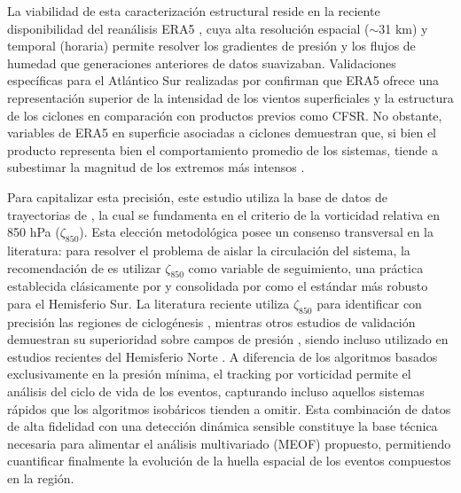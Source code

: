La viabilidad de esta caracterización estructural reside en la reciente disponibilidad del reanálisis ERA5 \citep{hersbach2020era5}, cuya alta resolución espacial ($\sim$31 km) y temporal (horaria) permite resolver los gradientes de presión y los flujos de humedad que generaciones anteriores de datos suavizaban. Validaciones específicas para el Atlántico Sur realizadas por \citet{gramcianinov2020analysis} confirman que ERA5 ofrece una representación superior de la intensidad de los vientos superficiales y la estructura de los ciclones en comparación con productos previos como CFSR.
No obstante, variables de ERA5 en superficie asociadas a ciclones demuestran que, si bien el producto representa bien el comportamiento promedio de los sistemas, tiende a subestimar la magnitud de los extremos más intensos \citep{chen2024evaluation}.

Para capitalizar esta precisión, este estudio utiliza la base de datos de trayectorias de \citet{coutodesouza2024new}, la cual se fundamenta en el criterio de la vorticidad relativa en 850 hPa ($\zeta_{850}$). Esta elección metodológica posee un consenso transversal en la literatura: para resolver el problema de aislar la circulación del sistema, la recomendación de \citet{sinclair1997objective} es utilizar $\zeta_{850}$ como variable de seguimiento, una práctica establecida clásicamente por \citet{sinclair1994objective} y consolidada por \citet{padilhareinke2024objective} como el estándar más robusto para el Hemisferio Sur. La literatura reciente utiliza $\zeta_{850}$ para identificar con precisión las regiones de ciclogénesis \citep{gramcianinov2019properties}, mientras otros estudios de validación demuestran su superioridad sobre campos de presión \citep{padilhareinke2024objective}, siendo incluso utilizado en estudios recientes del Hemisferio Norte \citep{chen2025characteristics}. 
A diferencia de los algoritmos basados exclusivamente en la presión mínima, el tracking por vorticidad permite el análisis del ciclo de vida de los eventos, capturando incluso aquellos sistemas rápidos que los algoritmos isobáricos tienden a omitir. Esta combinación de datos de alta fidelidad con una detección dinámica sensible constituye la base técnica necesaria para alimentar el análisis multivariado (MEOF) propuesto, permitiendo cuantificar finalmente la evolución de la huella espacial de los eventos compuestos en la región.
